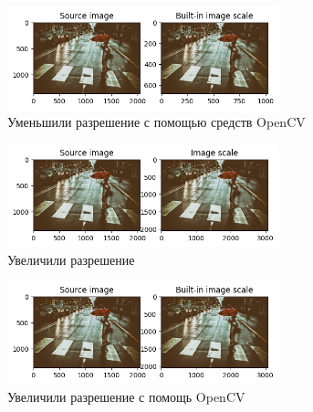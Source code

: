 \documentclass[a4paper,12pt]{article}
\begin{document}
\begin{figure}[H]
    \centering \includegraphics[width=0.7\textwidth]{my_images/15.png}
    \caption{Уменьшили разрешение с помощью средств OpenCV}
\end{figure}
\begin{figure}[H]
    \centering \includegraphics[width=0.7\textwidth]{my_images/16.png}
    \caption{Увеличили разрешение}
\end{figure}
\begin{figure}[H]
    \centering \includegraphics[width=0.7\textwidth]{my_images/17.png}
    \caption{Увеличили разрешение с помощь OpenCV}
\end{figure}
\end{document}
